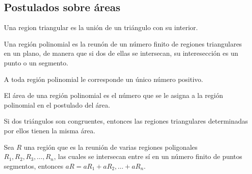\subsection{Postulados sobre áreas}

\begin{definition}
    Una region triangular es la unión de un triángulo con su interior.
\end{definition}

\begin{definition}
    Una región polinomial es la reunón de un número finito de regiones triangulares en un plano, de manera que si dos de ellas se intersecan, su interesección es un punto o un segmento.

    \begin{figure}[!h]
        \centering
        
        \label{fig:region-polinomial}
    \end{figure}
    
\end{definition}

\begin{postulate}
    A toda región polinomial le corresponde un único número positivo.
\end{postulate}

\begin{definition}
    El área de una región polinomial es el número que se le asigna a la región polinomial en el postulado del área.

    \begin{figure}[!h]
        \centering
        
        \label{fig:area-polinomial}
    \end{figure}
    
\end{definition}

\begin{postulate}
    Si dos triángulos son congruentes, entonces las regiones triangulares determinadas por ellos tienen la misma área.
\end{postulate}

\begin{postulate}
    Sea $R$ una región que es la reunión de varias regiones poligonales $R_1,R_2,R_3,\dots,R_n$, las cuales se intersecan entre sí en un número finito de puntos segmentos, entonces $aR = aR_1 + aR_2, \dots + aR_n$.
\end{postulate}

